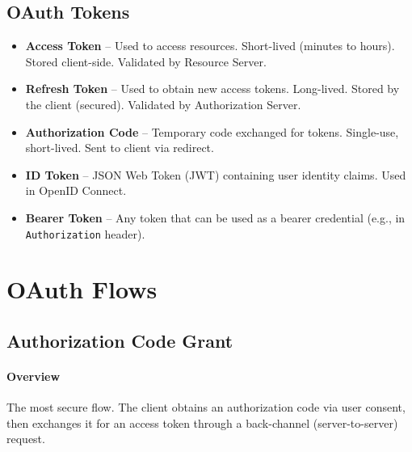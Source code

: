 \documentclass[12pt,a4paper]{article}
\begin{document}
\subsection{OAuth Tokens}
\begin{itemize}
    \item \textbf{Access Token} – Used to access resources. Short-lived (minutes to hours). Stored client-side. Validated by Resource Server.
    \item \textbf{Refresh Token} – Used to obtain new access tokens. Long-lived. Stored by the client (secured). Validated by Authorization Server.
    \item \textbf{Authorization Code} – Temporary code exchanged for tokens. Single-use, short-lived. Sent to client via redirect.
    \item \textbf{ID Token} – JSON Web Token (JWT) containing user identity claims. Used in OpenID Connect.
    \item \textbf{Bearer Token} – Any token that can be used as a bearer credential (e.g., in \texttt{Authorization} header).
\end{itemize}

\section{OAuth Flows}
\subsection{Authorization Code Grant}
\paragraph{Overview} The most secure flow. The client obtains an authorization code via user consent, then exchanges it for an access token through a back-channel (server-to-server) request.

\end{document}
